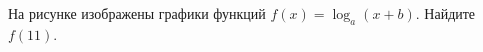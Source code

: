 \begin{ex}
	\begin{condition}
		\begin{minipage}[t]{0.67\textwidth}
			На рисунке изображены графики функций \( f(x)=\log_a(x+b) \). Найдите \( f(11) \). 
		\end{minipage}
		\begin{minipage}[c]{0.25\textwidth}
		\end{minipage}
	\end{condition}
\end{ex}